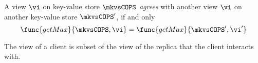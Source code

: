 \begin{mathpar}
\end{mathpar}

A view \( \vi \) on key-value store \( \mkvsCOPS \) \emph{agrees} 
with another view \( \vi \) on another key-value store \( \mkvsCOPS' \), if and only
\[
 \func{getMax}{\mkvsCOPS, \vi} = \func{getMax}{\mkvsCOPS', \vi'}
\]




\begin{lemma}
    \label{lem:client-subset-repl}
    The view of a client is subset of the view of the replica that the client interacts with.
\end{lemma}


